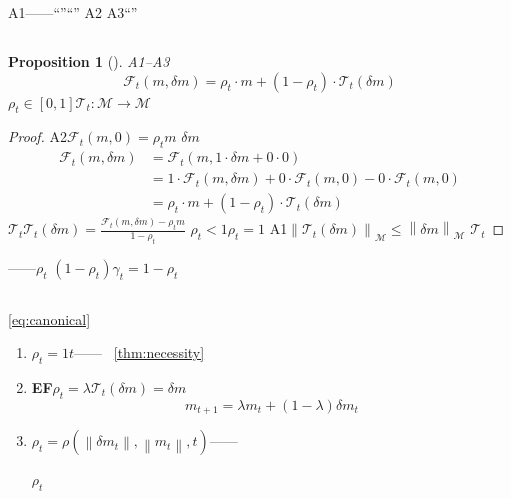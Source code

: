 \documentclass[11pt,a4paper]{article}
\newtheorem{proposition}[theorem]{Proposition}
\theoremstyle{remark}
\newcommand{\Mmem}{\mathcal{M}}
\newcommand{\Fforget}{\mathcal{F}}
\newcommand{\norm}[1]{\left\lVert#1\right\rVert}
\begin{document}
A1——``''``''
A2
A3``''

\subsection{}

\begin{proposition}[]\label{prop:canonical}
A1--A3
\begin{equation}
    \boxed{
    \Fforget_t(m, \delta m) = \rho_t \cdot m + (1 - \rho_t) \cdot \mathcal{T}_t(\delta m)
    }
\label{eq:canonical}
\end{equation}
$\rho_t \in [0, 1]$$\mathcal{T}_t: \Mmem \to \Mmem$
\end{proposition}

\begin{proof}
A2$\Fforget_t(m, 0) = \rho_t m$
$\delta m$
\begin{align}
    \Fforget_t(m, \delta m)
    &= \Fforget_t(m, 1 \cdot \delta m + 0 \cdot 0) \nonumber\\
    &= 1 \cdot \Fforget_t(m, \delta m) + 0 \cdot \Fforget_t(m, 0) - 0 \cdot \Fforget_t(m, 0) \nonumber\\
    &= \rho_t \cdot m + (1 - \rho_t) \cdot \mathcal{T}_t(\delta m)
\end{align}
$\mathcal{T}_t$$\mathcal{T}_t(\delta m) = \frac{\Fforget_t(m, \delta m) - \rho_t m}{1-\rho_t}$
$\rho_t < 1$$\rho_t = 1$
A1$\norm{\mathcal{T}_t(\delta m)}_{\Mmem} \leq \norm{\delta m}_{\Mmem}$
$\mathcal{T}_t$
\end{proof}

\textbf{}——$\rho_t$
$(1-\rho_t)$$\gamma_t = 1 - \rho_t$


\subsection{}

\eqref{eq:canonical}

\begin{enumerate}[label=(\arabic*)]
    \item \textbf{}$\rho_t = 1$$t$——
          ~\ref{thm:necessity}
    \item \textbf{EF}$\rho_t = \lambda$$\mathcal{T}_t(\delta m) = \delta m$
          \begin{equation}
              m_{t+1} = \lambda m_t + (1-\lambda) \delta m_t
          \end{equation}
    \item \textbf{}$\rho_t = \rho(\norm{\delta m_t}, \norm{m_t}, t)$——
          
          $\rho_t$
\end{enumerate}
\end{document}
